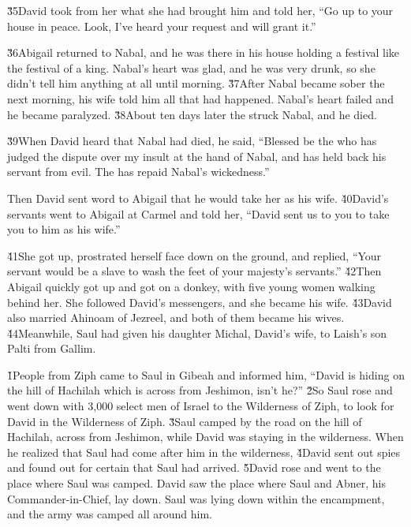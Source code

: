\v{35}David took from her what she had brought him and told her, ``Go up to your house in peace. Look, I've heard your request and will grant it.''

\v{36}Abigail returned to Nabal, and he was there in his house holding a festival like the festival of a king. Nabal's heart was glad, and he was very drunk, so she didn't tell him anything at all until morning. \v{37}After Nabal became sober the next morning, his wife told him all that had happened. Nabal's heart failed and he became paralyzed. \v{38}About ten days later the  struck Nabal, and he died.

\v{39}When David heard that Nabal had died, he said, ``Blessed be the  who has judged the dispute over my insult at the hand of Nabal, and has held back his servant from evil. The  has repaid Nabal's wickedness.''

Then David sent word to Abigail that he would take her as his wife. \v{40}David's servants went to Abigail at Carmel and told her, ``David sent us to you to take you to him as his wife.''

\v{41}She got up, prostrated herself face down on the ground, and replied, ``Your servant would be a slave to wash the feet of your majesty's servants.'' \v{42}Then Abigail quickly got up and got on a donkey, with five young women walking behind her. She followed David's messengers, and she became his wife. \v{43}David also married Ahinoam of Jezreel, and both of them became his wives. \v{44}Meanwhile, Saul had given his daughter Michal, David's wife, to Laish's son Palti from Gallim.

\v{1}People from Ziph came to Saul in Gibeah and informed him, ``David is hiding on the hill of Hachilah which is across from Jeshimon, isn't he?'' \v{2}So Saul rose and went down with 3,000 select men of Israel to the Wilderness of Ziph, to look for David in the Wilderness of Ziph. \v{3}Saul camped by the road on the hill of Hachilah, across from Jeshimon, while David was staying in the wilderness. When he realized that Saul had come after him in the wilderness, \v{4}David sent out spies and found out for certain that Saul had arrived. \v{5}David rose and went to the place where Saul was camped. David saw the place where Saul and Abner, his Commander-in-Chief, lay down. Saul was lying down within the encampment, and the army was camped all around him.


